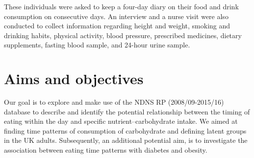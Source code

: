 These individuals were asked to keep a four-day diary on their food and drink consumption on consecutive days. An interview and a nurse visit were also conducted to collect information regarding height and weight, smoking and drinking habits, physical activity, blood pressure, prescribed medicines, dietary supplements, fasting blood sample, and 24-hour urine sample. \vspace{-0.3cm}

\section{Aims and objectives}\vspace{-0.3cm}


Our goal is to explore and make use of the NDNS RP (2008/09-2015/16) database to describe and identify the potential relationship between the timing of eating within the day and specific nutrient--carbohydrate intake. We aimed at finding time patterns of consumption of carbohydrate and defining latent groups in the UK adults. Subsequently, an additional potential aim, is to investigate the association between eating time patterns with diabetes and obesity.


